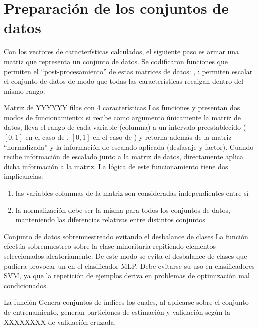 \section{Preparación de los conjuntos de datos}
Con los vectores de características calculados, el siguiente paso es
armar una matriz que representa un conjunto de datos.  Se codificaron
funciones que permiten el ``post-procesamiento'' de estas matrices de
datos: , : permiten escalar el
conjunto de datos de modo que todas las características recaigan
dentro del mismo rango.

 {Matriz de YYYYYY filas con 4
características}
Las funciones  y  presentan dos
modos de funcionamiento: si recibe como argumento únicamente la matriz
de datos, lleva el rango de cada variable (columna) a un intervalo
preestablecido ($[0,1]$ en el caso de , $[0,1]$ en
el caso de ) y retorna además de la matriz
``normalizada'' y la información de escalado aplicada (desfasaje y
factor).  Cuando recibe información de escalado junto a la matriz de
datos, directamente aplica dicha información a la matriz.  La lógica
de este funcionamiento tiene dos implicancias:

\begin{enumerate}
\item las variables columnas de la matriz son consideradas
  independientes entre sí
\item la normalización debe ser la misma para todos los conjuntos de
  datos, manteniendo las diferencias relativas entre distintos
  conjuntos
\end{enumerate}

 {Conjunto de datos sobremuestreado evitando
el desbalance de clases}
La función  efectúa sobremuestreo sobre la
clase minoritaria repitiendo elementos seleccionados
aleatoriamente. De este modo se evita el desbalance de clases que
pudiera provocar un  en el clasificador MLP.  Debe evitarse
su uso en clasificadores SVM, ya que la repetición de ejemplos deriva
en problemas de optimización mal condicionados.

La función  Genera conjuntos de índices los cuales, al
aplicarse sobre el conjunto de entrenamiento, generan particiones de
estimación y validación según la XXXXXXXX de validación cruzada.